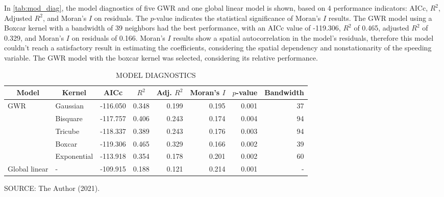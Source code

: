 
In \autoref{tab:mod_diag}, the model diagnostics of five GWR and one global linear model is shown, based on 4 performance indicators: AICc, $R^2$, Adjusted $R^2$, and Moran's $I$ on residuals. The $p$-value indicates the statistical significance of Moran's $I$ results. The GWR model using a Boxcar kernel with a bandwidth of 39 neighbors had the best performance, with an AICc value of -119.306, $R^2$ of 0.465, adjusted $R^2$ of 0.329, and Moran's $I$ on residuals of 0.166. Moran's $I$ results show a spatial autocorrelation in the model's residuals, therefore this model couldn't reach a satisfactory result in estimating the coefficients, considering the spatial dependency and nonstationarity of the speeding variable. The GWR model with the boxcar kernel was selected, considering its relative performance. 

\begin{table}[!htbp]
    \footnotesize
    \captionsetup{justification=raggedright,
        singlelinecheck=false,
        font=footnotesize}
    \caption{MODEL DIAGNOSTICS}
    \centering
    \begin{tabular}{llrrrrrr}
        \hline
        \multicolumn{1}{c}{\textbf{Model}} & \multicolumn{1}{c}{\textbf{Kernel}} & \multicolumn{1}{c}{\textbf{AICc}} & \multicolumn{1}{c}{\textbf{$R^2$}} &
        \multicolumn{1}{c}{\textbf{Adj. $R^2$}} & \multicolumn{1}{c}{\textbf{Moran's $I$}} & \multicolumn{1}{c}{\textbf{$p$-value}} & \multicolumn{1}{c}{\textbf{Bandwidth}} \\
        \hline
        GWR & Gaussian & -116.050 & 0.348 & 0.199 & 0.195 & 0.001 & 37 \\
            & Bisquare & -117.757 & 0.406 & 0.243 & 0.174 & 0.004 & 94 \\
            & Tricube & -118.337 & 0.389 & 0.243 & 0.176 & 0.003 & 94 \\
            & Boxcar & -119.306 & 0.465 & 0.329 & 0.166 & 0.002 & 39 \\
            & Exponential & -113.918 & 0.354 & 0.178 & 0.201 & 0.002 & 60 \\
        Global linear & - & -109.915 & 0.188 & 0.121 & 0.214 & 0.001 & - \\
        \hline
    \end{tabular}
    \label{tab:mod_diag}
    \par \vspace{2mm} \footnotesize \raggedright
    SOURCE: The Author (2021).
\end{table}

